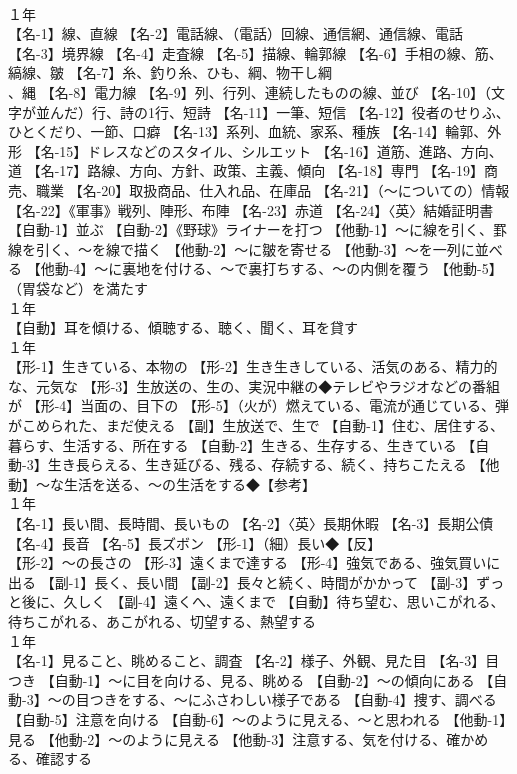 \documentclass[8pt]{extreport}
\begin{document}
\begin{CJK}{UTF8}{min}
\\	１年	
\\	【名-1】線、直線 【名-2】電話線、（電話）回線、通信網、通信線、電話 【名-3】境界線 【名-4】走査線 【名-5】描線、輪郭線 【名-6】手相の線、筋、縞線、皺 【名-7】糸、釣り糸、ひも、綱、物干し綱
\\	、縄 【名-8】電力線 【名-9】列、行列、連続したものの線、並び 【名-10】（文字が並んだ）行、詩の1行、短詩 【名-11】一筆、短信 【名-12】役者のせりふ、ひとくだり、一節、口癖 【名-13】系列、血統、家系、種族 【名-14】輪郭、外形 【名-15】ドレスなどのスタイル、シルエット 【名-16】道筋、進路、方向、道 【名-17】路線、方向、方針、政策、主義、傾向 【名-18】専門 【名-19】商売、職業 【名-20】取扱商品、仕入れ品、在庫品 【名-21】（～についての）情報 【名-22】《軍事》戦列、陣形、布陣 【名-23】赤道 【名-24】〈英〉結婚証明書 【自動-1】並ぶ 【自動-2】《野球》ライナーを打つ 【他動-1】～に線を引く、罫線を引く、～を線で描く 【他動-2】～に皺を寄せる 【他動-3】～を一列に並べる 【他動-4】～に裏地を付ける、～で裏打ちする、～の内側を覆う 【他動-5】（胃袋など）を満たす
\\	１年	
\\	【自動】耳を傾ける、傾聴する、聴く、聞く、耳を貸す
\\	１年	
\\	【形-1】生きている、本物の 【形-2】生き生きしている、活気のある、精力的な、元気な 【形-3】生放送の、生の、実況中継の◆テレビやラジオなどの番組が 【形-4】当面の、目下の 【形-5】（火が）燃えている、電流が通じている、弾がこめられた、まだ使える 【副】生放送で、生で 【自動-1】住む、居住する、暮らす、生活する、所在する 【自動-2】生きる、生存する、生きている 【自動-3】生き長らえる、生き延びる、残る、存続する、続く、持ちこたえる 【他動】～な生活を送る、～の生活をする◆【参考】
\\	１年	
\\	【名-1】長い間、長時間、長いもの 【名-2】〈英〉長期休暇 【名-3】長期公債 【名-4】長音 【名-5】長ズボン 【形-1】（細）長い◆【反】
\\	【形-2】～の長さの 【形-3】遠くまで達する 【形-4】強気である、強気買いに出る 【副-1】長く、長い間 【副-2】長々と続く、時間がかかって 【副-3】ずっと後に、久しく 【副-4】遠くへ、遠くまで 【自動】待ち望む、思いこがれる、待ちこがれる、あこがれる、切望する、熱望する
\\	１年	
\\	【名-1】見ること、眺めること、調査 【名-2】様子、外観、見た目 【名-3】目つき 【自動-1】～に目を向ける、見る、眺める 【自動-2】～の傾向にある 【自動-3】～の目つきをする、～にふさわしい様子である 【自動-4】捜す、調べる 【自動-5】注意を向ける 【自動-6】～のように見える、～と思われる 【他動-1】見る 【他動-2】～のように見える 【他動-3】注意する、気を付ける、確かめる、確認する

\end{CJK}
\end{document}
